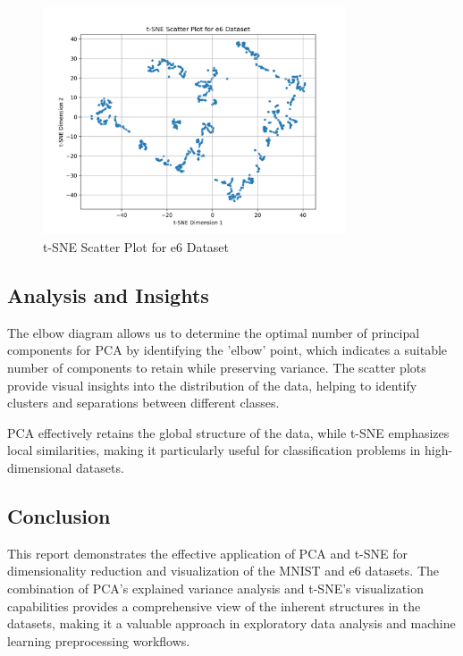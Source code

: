 \begin{figure}[H]
    \centering
    \includegraphics[width=0.8\textwidth]{Images/P3-tsne_scatter_plot_e6.png}
    \caption{t-SNE Scatter Plot for e6 Dataset}
    \label{fig:tsne_scatter_plot_e6}
\end{figure}

\subsection{Analysis and Insights}
The elbow diagram allows us to determine the optimal number of principal components for PCA by identifying the 'elbow' point, which indicates a suitable number of components to retain while preserving variance. The scatter plots provide visual insights into the distribution of the data, helping to identify clusters and separations between different classes.

PCA effectively retains the global structure of the data, while t-SNE emphasizes local similarities, making it particularly useful for classification problems in high-dimensional datasets.

\subsection{Conclusion}
This report demonstrates the effective application of PCA and t-SNE for dimensionality reduction and visualization of the MNIST and e6 datasets. The combination of PCA's explained variance analysis and t-SNE's visualization capabilities provides a comprehensive view of the inherent structures in the datasets, making it a valuable approach in exploratory data analysis and machine learning preprocessing workflows.